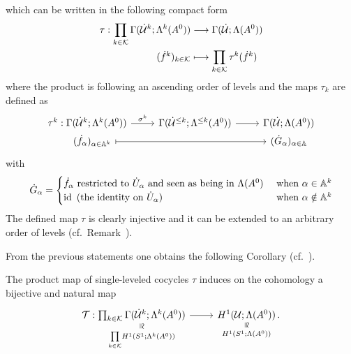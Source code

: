 \begin{prop}
  which can be written in the following compact form
  \begin{align*}
    \tau:\prod_{k\in\mathcal{K}}\Gamma(\dot {\mathcal{U}}^k;\Lambda^k(A^0))
    &\longrightarrow
    \Gamma(\dot{\mathcal{U}};\Lambda(A^0))
  \\(\dot f^k)_{k\in\mathcal{K}}
    &\longmapsto
    \prod_{k\in\mathcal{K}}\tau^k(\dot f^k)
  \end{align*}
  where the product is following an ascending order of levels and the maps
  $\tau_k$ are defined as
  \[ \begin{tikzcd}[row sep=0cm]
    \tau^k:\Gamma(\dot\cU^k;\Lambda^k(A^0))
    \arrow{r}{\sigma^k}&
    \Gamma(\dot\cU^{\leq k};\Lambda^{\leq k}(A^0))
    \rar &
    \Gamma(\dot\cU;\Lambda(A^0))
  \\~~~(\dot f_\alpha)_{\alpha\in\A^k}
    \arrow[|->]{rr}
    &&
    (\dot G_\alpha)_{\alpha\in\A}
  \end{tikzcd} \]
  with
  \[
    \dot G_\alpha=\begin{cases}
      \dot f_\alpha \text{~restricted to } \dot U_\alpha
      \text{~and seen as being in } \Lambda(A^0)
      & \text{~when } \alpha\in\mathbb{A}^k
    \\\operatorname{id} \text{~(the identity on $\dot U_\alpha$) }
      & \text{~when } \alpha\notin\mathbb{A}^k
    \end{cases}
  \]
  The defined map $\tau$ is clearly injective and it can be extended to an
  arbitrary order of levels (cf.\ Remark~\cite[Rem.II.3.5]{Loday1994}).
\end{prop}
From the previous statements one obtains the following Corollary (cf.\
\cite[Prop.II.3.4]{Loday1994}).
\begin{cor}
  The product map of single-leveled cocycles $\tau$ induces on the cohomology
  a bijective and natural map
  \[ \begin{tikzcd}
    \cT:
    \underset{\underset{k\in\cK}\prod H^1(S^1;\Lambda^k(A^0))}{%
      \underset{\text{\rotatebox[origin=c]{-90}{$\cong$}}}{%
        \prod_{k\in\cK}\Gamma(\dot\cU^k;\Lambda^k(A^0))}}
    \rar&
    \underset{H^1(S^1;\Lambda(A^0))}{%
      \underset{\text{\rotatebox[origin=c]{-90}{$\cong$}}}{%
        H^1(\cU;\Lambda(A^0))}}\,.
  \end{tikzcd} \]
\end{cor}

